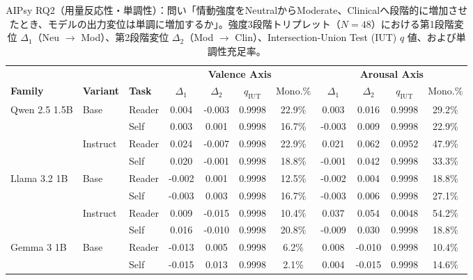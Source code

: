 \begin{table}[htbp]
\centering
\small
\caption{AIPsy RQ2（用量反応性・単調性）：問い「情動強度をNeutralからModerate、Clinicalへ段階的に増加させたとき、モデルの出力変位は単調に増加するか」。強度3段階トリプレット（$N=48$）における第1段階変位 $\Delta_1$（Neu $\to$ Mod）、第2段階変位 $\Delta_2$（Mod $\to$ Clin）、Intersection-Union Test (IUT) $q$ 値、および単調性充足率。}
\label{tab:behavioral_aipsy_rq2_dose_response}
\begin{tabular}{lll cccc cccc}
\toprule
 & & & \multicolumn{4}{c}{\textbf{Valence Axis}} & \multicolumn{4}{c}{\textbf{Arousal Axis}} \\
\cmidrule(lr){4-7} \cmidrule(lr){8-11}
\textbf{Family} & \textbf{Variant} & \textbf{Task} & $\Delta_1$ & $\Delta_2$ & $q_{\text{IUT}}$ & Mono.\% & $\Delta_1$ & $\Delta_2$ & $q_{\text{IUT}}$ & Mono.\% \\
\midrule
\multirow{4}{*}{Qwen 2.5 1.5B} & \multirow{2}{*}{Base} & Reader     & 0.004 & -0.003 & 0.9998 & 22.9\% & 0.003 & 0.016 & 0.9998 & 29.2\% \\
                       &                      & Self       & 0.003 & 0.001 & 0.9998 & 16.7\% & -0.003 & 0.009 & 0.9998 & 22.9\% \\
\cmidrule(lr){2-11}
                       & \multirow{2}{*}{Instruct} & Reader     & 0.024 & -0.007 & 0.9998 & 22.9\% & 0.021 & 0.062 & 0.0952 & 47.9\% \\
                       &                      & Self       & 0.020 & -0.001 & 0.9998 & 18.8\% & -0.001 & 0.042 & 0.9998 & 33.3\% \\
\midrule
\multirow{4}{*}{Llama 3.2 1B} & \multirow{2}{*}{Base} & Reader     & -0.002 & 0.001 & 0.9998 & 12.5\% & -0.002 & 0.004 & 0.9998 & 18.8\% \\
                       &                      & Self       & -0.003 & 0.003 & 0.9998 & 16.7\% & -0.003 & 0.006 & 0.9998 & 27.1\% \\
\cmidrule(lr){2-11}
                       & \multirow{2}{*}{Instruct} & Reader     & 0.009 & -0.015 & 0.9998 & 10.4\% & 0.037 & 0.054 & 0.0048 & 54.2\% \\
                       &                      & Self       & 0.016 & -0.010 & 0.9998 & 20.8\% & -0.009 & 0.030 & 0.9998 & 18.8\% \\
\midrule
\multirow{4}{*}{Gemma 3 1B} & \multirow{2}{*}{Base} & Reader     & -0.013 & 0.005 & 0.9998 & 6.2\% & 0.008 & -0.010 & 0.9998 & 10.4\% \\
                       &                      & Self       & -0.015 & 0.013 & 0.9998 & 2.1\% & 0.004 & -0.015 & 0.9998 & 14.6\% \\

\end{tabular}
\end{table}
